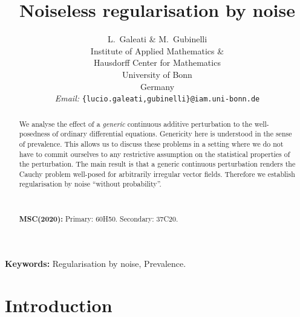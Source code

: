 \documentclass[10pt]{article}
\newcommand{\tmaffiliation}[1]{\\ #1}
\newcommand{\tmemail}[1]{\\ \textit{Email:} \texttt{#1}}
\newcommand{\tmtextbf}[1]{{\bfseries{#1}}}
\newcommand{\tmtextit}[1]{{\itshape{#1}}}
\newcommand{\tmkeywords}{\textbf{Keywords:} }
\begin{document}
\title{Noiseless regularisation by noise}

\author{
  L.~Galeati \& M.~Gubinelli
  \tmaffiliation{Institute of Applied Mathematics \&\\
  Hausdorff Center for Mathematics\\
  University of Bonn\\
  Germany}
  \tmemail{\{lucio.galeati,gubinelli\}@iam.uni-bonn.de}
}

\date{}

\maketitle

\begin{abstract}
  We analyse the effect of a \tmtextit{generic} continuous additive
  perturbation to the well-posedness of ordinary differential equations.
  Genericity here is understood in the sense of prevalence. This allows us to
  discuss these problems in a setting where we do not have to commit ourselves
  to any restrictive assumption on the statistical properties of the
  perturbation. The main result is that a generic continuous perturbation
  renders the Cauchy problem well-posed for arbitrarily irregular vector
  fields. Therefore we establish regularisation by noise ``without
  probability''.
  
  \
  
  {\noindent}\tmtextbf{MSC(2020):} Primary: 60H50. Secondary: 37C20.
\end{abstract}

\tmkeywords{Regularisation by noise, Prevalence.}

{\tableofcontents}

\section{Introduction}\label{sec1}
\end{document}
